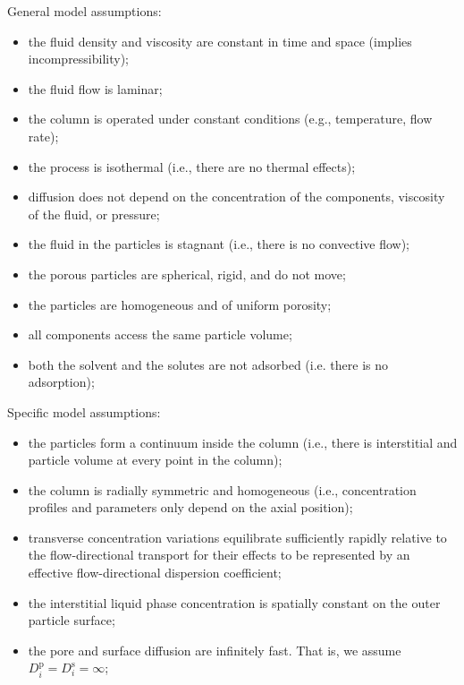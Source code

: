 \documentclass{article}
\begin{document}
General model assumptions:
\begin{itemize}
    \item the fluid density and viscosity are constant in time and space (implies incompressibility);
    \item the fluid flow is laminar;
    \item the column is operated under constant conditions (e.g., temperature, flow rate);
    \item the process is isothermal (i.e., there are no thermal effects);
    \item diffusion does not depend on the concentration of the components, viscosity of the fluid, or pressure;
    \item the fluid in the particles is stagnant (i.e., there is no convective flow);
    \item the porous particles are spherical, rigid, and do not move;
    \item the particles are homogeneous and of uniform porosity;
    \item all components access the same particle volume;
    \item both the solvent and the solutes are not adsorbed (i.e. there is no adsorption);
\end{itemize}

Specific model assumptions:
\begin{itemize}
    \item the particles form a continuum inside the column (i.e., there is interstitial and particle volume at every point in the column);
    \item the column is radially symmetric and homogeneous (i.e., concentration profiles and parameters only depend on the axial position);
    \item transverse concentration variations equilibrate sufficiently rapidly relative to the flow-directional transport for their effects to be represented by an effective flow-directional dispersion coefficient;
    \item the interstitial liquid phase concentration is spatially constant on the outer particle surface;
    \item the pore and surface diffusion are infinitely fast. That is, we assume $D^{\mathrm{p}}_{i} = D^{\mathrm{s}}_{i} = \infty$;
\end{itemize}
\end{document}
